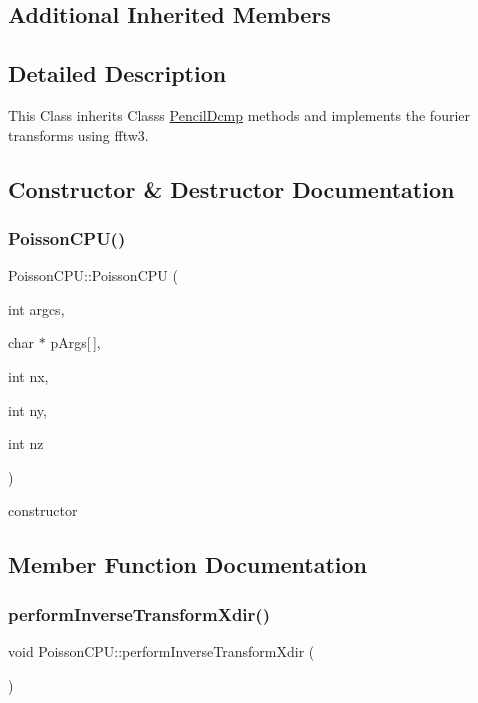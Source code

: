 \subsection*{Additional Inherited Members}


\subsection{Detailed Description}
This Class inherits Classs \mbox{\hyperlink{classPencilDcmp}{Pencil\+Dcmp}} methods and implements the fourier transforms using fftw3. 

\subsection{Constructor \& Destructor Documentation}
\mbox{\label{classPoissonCPU_a3d0e8115ad16749dee9140ce1a6093a4}} 
\subsubsection{\texorpdfstring{Poisson\+C\+P\+U()}{PoissonCPU()}}
{\footnotesize\ttfamily Poisson\+C\+P\+U\+::\+Poisson\+C\+PU (\begin{DoxyParamCaption}\item[{int}]{argcs,  }\item[{char $\ast$}]{p\+Args\mbox{[}$\,$\mbox{]},  }\item[{int}]{nx,  }\item[{int}]{ny,  }\item[{int}]{nz }\end{DoxyParamCaption})\hspace{0.3cm}{\ttfamily [inline]}}

constructor 

\subsection{Member Function Documentation}
\mbox{\label{classPoissonCPU_a47781a3401da674f472d1b5d9d70d5bb}} 
\subsubsection{\texorpdfstring{perform\+Inverse\+Transform\+Xdir()}{performInverseTransformXdir()}}
{\footnotesize\ttfamily void Poisson\+C\+P\+U\+::perform\+Inverse\+Transform\+Xdir (\begin{DoxyParamCaption}{ }\end{DoxyParamCaption})}

